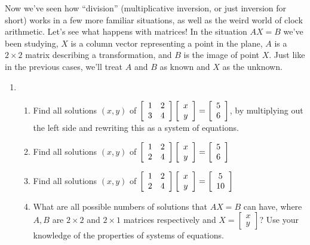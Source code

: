 \documentclass[../gatm.tex]{subfiles}
\begin{document}
Now we've seen how ``division'' (multiplicative inversion, or just inversion for short) works in a few more familiar situations, as well as the weird world of clock arithmetic. Let's see what happens with matrices! In the situation $AX=B$ we've been studying, $X$ is a column vector representing a point in the plane, $A$ is a $2\times 2$ matrix describing a transformation, and $B$ is the image of point $X$. Just like in the previous cases, we'll treat $A$ and $B$ as known and $X$ as the unknown.

\begin{enumerate}
\setcounter{enumi}{\value{problem_i}}
\item \begin{enumerate}
\item \label{prob:needed_for_matrix_undo3}Find all solutions $(x,y)$ of $\left[\begin{array}{cc} 1 & 2 \\ 3 & 4 \end{array}\right]\left[\begin{array}{c} x \\ y \end{array}\right]=\left[\begin{array}{c} 5 \\ 6 \end{array}\right]$, by multiplying out the left side and rewriting this as a system of equations.
\item \label{prob:needed_for_matrix_undo4}Find all solutions $(x,y)$ of $\left[\begin{array}{cc} 1 & 2 \\ 2 & 4 \end{array}\right]\left[\begin{array}{c} x \\ y \end{array}\right]=\left[\begin{array}{c} 5 \\ 6 \end{array}\right]$
\item Find all solutions $(x,y)$ of $\left[\begin{array}{cc} 1 & 2 \\ 2 & 4 \end{array}\right]\left[\begin{array}{c} x \\ y \end{array}\right]=\left[\begin{array}{c} 5 \\ 10 \end{array}\right]$
\item What are all possible numbers of solutions that $AX=B$ can have, where $A,B$ are $2\times 2$ and $2\times 1$ matrices respectively and $X=\left[\begin{smallmatrix} x \\ y \end{smallmatrix}\right]$? Use your knowledge of the properties of systems of equations.

\end{enumerate}
\end{enumerate}
\end{document}
